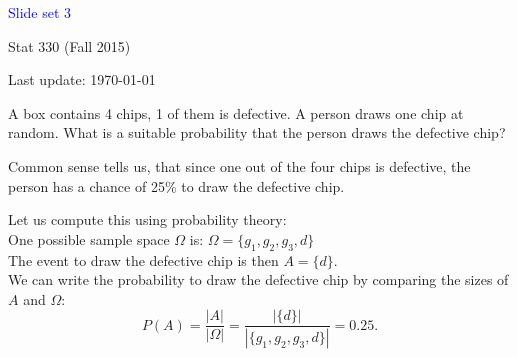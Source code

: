 \documentclass[20pt,landscape]{foils}
\newcommand{\no}{\noindent}
\newcommand{\bul}{\hspace*{.3in}{\textcolor{red}{$\bullet$ \ }}}
\begin{document}
\LogoOff

\foilhead[1.3in]{}
\centerline{\LARGE \textcolor{blue}{Slide set 3}}
\vspace{0.3in}
\centerline{\large Stat 330 (Fall 2015)}
\vspace{0.2in}
\centerline{\tiny Last update: \today}
\setcounter{page}{0}

\foilhead[-.7in]{\textcolor{blue}{Example 1}}
\no A box contains 4 chips, 1 of them is defective. A person draws one chip at random.
What is a suitable probability that the person draws the defective chip?

\no Common sense tells us, that since one out of the four chips is 
defective, the person has a chance of 25\% to draw the defective chip.

\no Let us compute this using probability theory:\\[.1in]
\bul One possible sample space $\Omega$ is: $\Omega = \{ g_{1}, g_{2}, g_{3}, d \}$\\[.1in]
\bul The event to draw the defective chip is then $A  = \{ d \}$.\\[.1in]
\bul We can write the probability to draw the defective chip by comparing 
the sizes of $A$ and $\Omega$:\\[.1in]
\[
P(A) = \frac{|A|}{|\Omega|} = \frac{|\{d\}|}{|\{ g_{1}, g_{2}, g_{3}, d 
\}|} = 0.25.
\]
\end{document}

